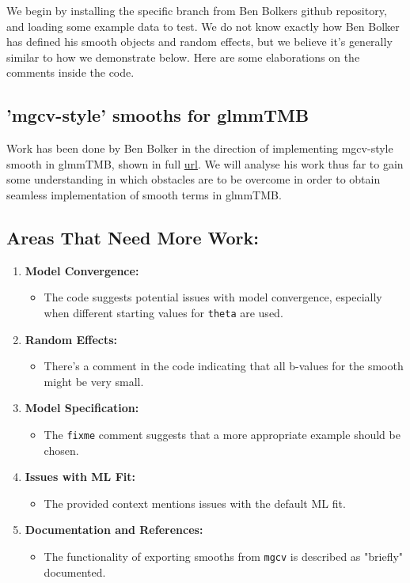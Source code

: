 We begin by installing the specific branch from Ben Bolkers github repository, and loading some example data to test.
We do not know exactly how Ben Bolker has defined his smooth objects and random effects, but we believe it's generally similar to how we demonstrate below. Here are some elaborations on the comments inside the code.

\subsection{'mgcv-style' smooths for glmmTMB}

Work has been done by Ben Bolker in the direction of implementing mgcv-style smooth in glmmTMB, shown in full \hyperref[here]{url}. We will analyse his work thus far to gain some understanding in which obstacles are to be overcome in order to obtain seamless implementation of smooth terms in glmmTMB. 

\subsection*{Areas That Need More Work:}

\begin{enumerate}[label=\arabic*.]
    \item \textbf{Model Convergence:}
    \begin{itemize}
        \item The code suggests potential issues with model convergence, especially when different starting values for \texttt{theta} are used.
    \end{itemize}
    
    \item \textbf{Random Effects:}
    \begin{itemize}
        \item There's a comment in the code indicating that all b-values for the smooth might be very small.
    \end{itemize}
    
    \item \textbf{Model Specification:}
    \begin{itemize}
        \item The \texttt{fixme} comment suggests that a more appropriate example should be chosen.
    \end{itemize}
    
    \item \textbf{Issues with ML Fit:}
    \begin{itemize}
        \item The provided context mentions issues with the default ML fit.
    \end{itemize}
    
    \item \textbf{Documentation and References:}
    \begin{itemize}
        \item The functionality of exporting smooths from \texttt{mgcv} is described as "briefly" documented.
    \end{itemize}
\end{enumerate}

